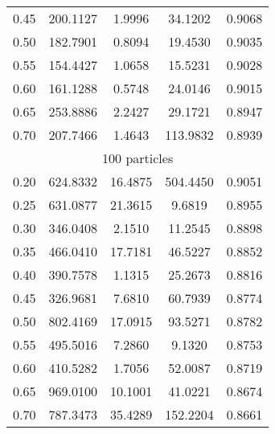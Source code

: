 \documentclass[
    a4paper, aps, twocolumn, floatfix, superscriptaddress,
    nofootinbib]{revtex4-1}
\begin{document}
\begin{table}[H]
{\begin{ruledtabular}
\begin{tabular}{ccccc}
0.45     & 200.1127 & 1.9996   & 34.1202    & 0.9068     \\
0.50     & 182.7901 & 0.8094   & 19.4530    & 0.9035       \\
0.55     & 154.4427 & 1.0658   & 15.5231    & 0.9028    \\
0.60     & 161.1288 & 0.5748   & 24.0146    & 0.9015        \\
0.65     & 253.8886 & 2.2427   & 29.1721    & 0.8947       \\
0.70     & 207.7466 & 1.4643   & 113.9832   & 0.8939       \\
\hline
\multicolumn{5}{c}{100 particles}               \\
\hline

0.20     & 624.8332 & 16.4875  & 504.4450   & 0.9051      \\
0.25     & 631.0877 & 21.3615  & 9.6819     & 0.8955      \\
0.30     & 346.0408 & 2.1510   & 11.2545    & 0.8898      \\
0.35     & 466.0410 & 17.7181  & 46.5227    & 0.8852      \\
0.40     & 390.7578 & 1.1315   & 25.2673    & 0.8816      \\
0.45     & 326.9681 & 7.6810   & 60.7939    & 0.8774      \\
0.50     & 802.4169 & 17.0915  & 93.5271    & 0.8782      \\
0.55     & 495.5016 & 7.2860   & 9.1320     & 0.8753      \\
0.60     & 410.5282 & 1.7056   & 52.0087    & 0.8719      \\
0.65     & 969.0100 & 10.1001  & 41.0221    & 0.8674      \\
0.70     & 787.3473 & 35.4289  & 152.2204   & 0.8661    \\
\end{tabular}
\end{ruledtabular}
}
\end{table}
\end{document}

